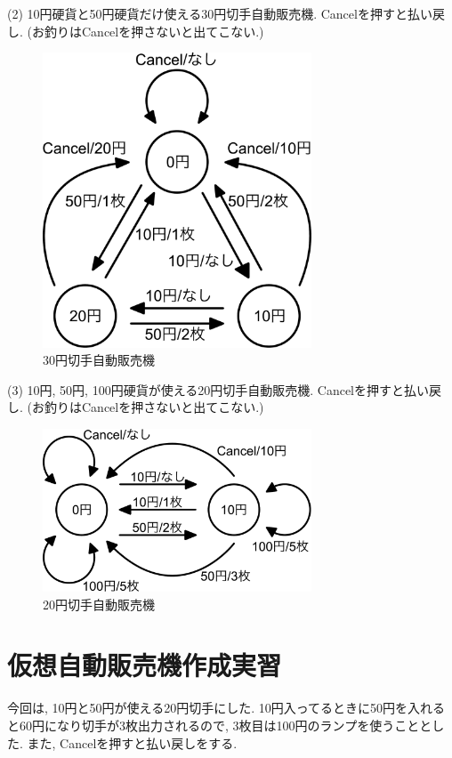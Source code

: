\documentclass[titlepage]{jsarticle}
\begin{document}
    (2) 10円硬貨と50円硬貨だけ使える30円切手自動販売機. Cancelを押すと払い戻し.
    (お釣りはCancelを押さないと出てこない.)

    \begin{figure}[ht]
        \centering
        \includegraphics[width=8cm]{images/30.pdf}
        \caption{30円切手自動販売機}
        \label{fig:30状態遷移図}
    \end{figure}

    (3) 10円, 50円, 100円硬貨が使える20円切手自動販売機. Cancelを押すと払い戻し.
    (お釣りはCancelを押さないと出てこない.)

    \begin{figure}[ht]
        \centering
        \includegraphics[width=8cm]{images/20.pdf}
        \caption{20円切手自動販売機}
        \label{fig:20状態遷移図}
    \end{figure}

\section{仮想自動販売機作成実習}
    今回は, 10円と50円が使える20円切手にした.
    10円入ってるときに50円を入れると60円になり切手が3枚出力されるので,
    3枚目は100円のランプを使うこととした.
    また, Cancelを押すと払い戻しをする.
\end{document}
